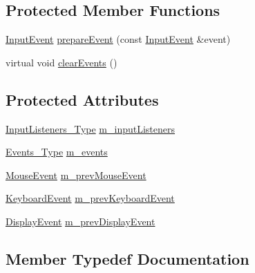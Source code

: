 \subsection*{Protected Member Functions}
\begin{DoxyCompactItemize}
\item 
\mbox{\hyperlink{structec_1_1_input_event}{Input\+Event}} \mbox{\hyperlink{classec_1_1_input_observable_a7aaa88f25dd3d8902bc6767240c83ecf}{prepare\+Event}} (const \mbox{\hyperlink{structec_1_1_input_event}{Input\+Event}} \&event)
\item 
virtual void \mbox{\hyperlink{classec_1_1_input_observable_a799c88abda6814473fe486654205f07b}{clear\+Events}} ()
\end{DoxyCompactItemize}
\subsection*{Protected Attributes}
\begin{DoxyCompactItemize}
\item 
\mbox{\hyperlink{classec_1_1_input_observable_a7a1e7fe634b426e59ddae7f11c21bebb}{Input\+Listeners\+\_\+\+Type}} \mbox{\hyperlink{classec_1_1_input_observable_a05b1b085184216601228522319efbe56}{m\+\_\+input\+Listeners}}
\item 
\mbox{\hyperlink{classec_1_1_input_observable_ac2476cc82c72ba20dcd8d5c89794f577}{Events\+\_\+\+Type}} \mbox{\hyperlink{classec_1_1_input_observable_a26f25d660227364fe1a1be19671af09e}{m\+\_\+events}}
\item 
\mbox{\hyperlink{structec_1_1_mouse_event}{Mouse\+Event}} \mbox{\hyperlink{classec_1_1_input_observable_a99e8c1484fe87503096e681d8bd3b75f}{m\+\_\+prev\+Mouse\+Event}}
\item 
\mbox{\hyperlink{structec_1_1_keyboard_event}{Keyboard\+Event}} \mbox{\hyperlink{classec_1_1_input_observable_acf14cdeb5a394fbd296ff3dfb391c14f}{m\+\_\+prev\+Keyboard\+Event}}
\item 
\mbox{\hyperlink{structec_1_1_display_event}{Display\+Event}} \mbox{\hyperlink{classec_1_1_input_observable_ae480593ec25d98ea00b0b7a9aa6cba32}{m\+\_\+prev\+Display\+Event}}
\end{DoxyCompactItemize}


\subsection{Member Typedef Documentation}
\mbox{\label{classec_1_1_input_observable_ac2476cc82c72ba20dcd8d5c89794f577}} 
